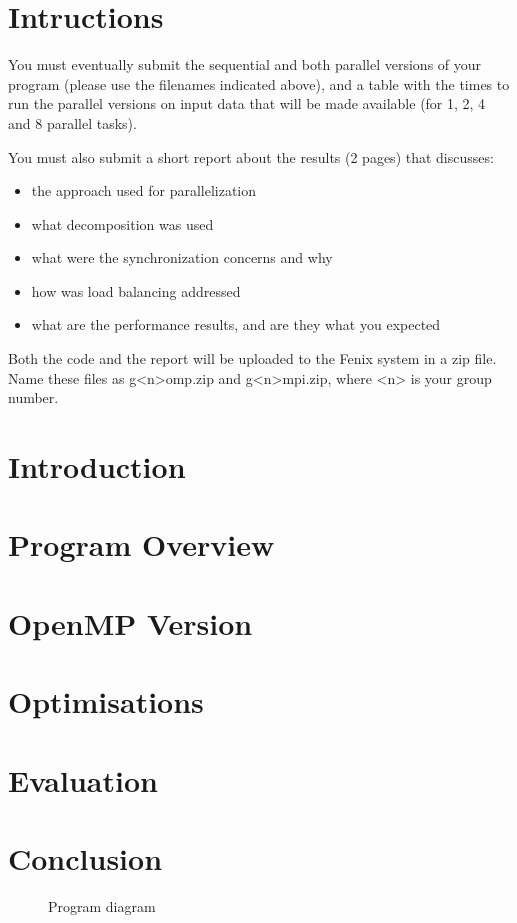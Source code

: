 \documentclass[twocolumn]{article}
\date{}
\title{
    \texttt{[image: images/logo.png]}\\
    \vskip 0.5em
    \Huge Distributed and Parallel Computing\\
    \LARGE OpenMP Report\\
}
\author{
    Pedro Rio\\
    \textit{MSc Data Science and Engineering}\\
    \textit{Instituto Superior Técnico}\\
    \textit{97241}
    \and
    Sebastião Maia Serqueira\\
    \textit{MSc Data Science and Engineering}\\
    \textit{Instituto Superior Técnico}\\
    \textit{97108}\\
    \and
    Eduardo Machado\\
    \textit{MSc Data Science and Engineering}\\
    \textit{Instituto Superior Técnico}\\
    \textit{97133}
}
\begin{document}
    \maketitle

    \section{Intructions}\label{sec:intructions}
    You must eventually submit the sequential and both parallel versions of your program (please use the
    filenames indicated above), and a table with the times to run the parallel versions on input data that
    will be made available (for 1, 2, 4 and 8 parallel tasks).

    You must also submit a short report about the results (2 pages) that discusses:
    \begin{itemize}
        \item the approach used for parallelization
        \item what decomposition was used
        \item what were the synchronization concerns and why
        \item how was load balancing addressed
        \item what are the performance results, and are they what you expected
    \end{itemize}

    Both the code and the report will be uploaded to the Fenix
    system in a zip file.
    Name these files as g<n>omp.zip and g<n>mpi.zip, where <n> is your
    group number.

    \section{Introduction}\label{sec:introduction}

    \section{Program Overview}\label{sec:program-overview}
    \section{OpenMP Version}\label{sec:openmp-version}
    \section{Optimisations}\label{sec:optimisations}
    \section{Evaluation}\label{sec:evaluation}
    \section{Conclusion}\label{sec:conclusion}


    \begin{figure}[h]
        \caption{Program diagram}
        \centering
    \end{figure}

    \cleardoublepage~\nocite{*}
    
    
\end{document}
